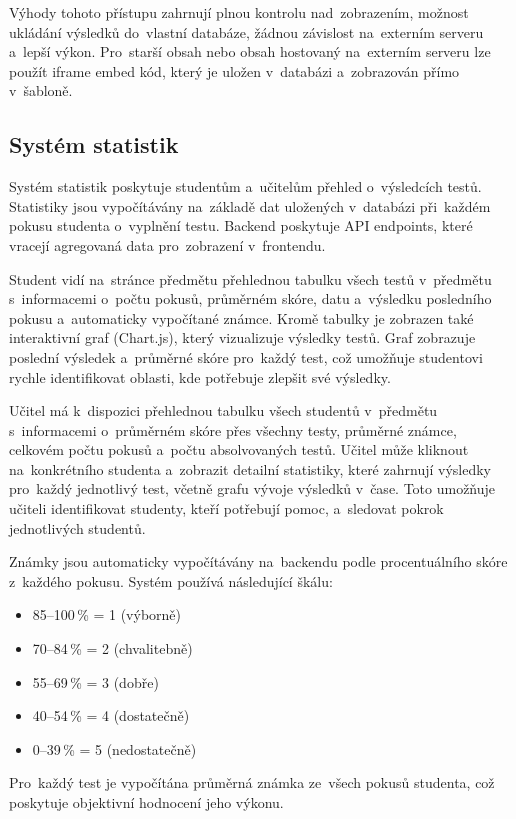\documentclass[12pt, a4paper,
twoside,
openany
]{report}
\begin{document}
	Výhody tohoto přístupu zahrnují plnou kontrolu nad~zobrazením, možnost ukládání výsledků do~vlastní databáze, žádnou závislost na~externím serveru a~lepší výkon. Pro~starší obsah nebo obsah hostovaný na~externím serveru lze použít iframe embed kód, který je uložen v~databázi a~zobrazován přímo v~šabloně.

	\subsection{Systém statistik}
	
	Systém statistik poskytuje studentům a~učitelům přehled o~výsledcích testů. Statistiky jsou vypočítávány na~základě dat uložených v~databázi při~každém pokusu studenta o~vyplnění testu. Backend poskytuje API endpoints, které vracejí agregovaná data pro~zobrazení v~frontendu.
	
	Student vidí na~stránce předmětu přehlednou tabulku všech testů v~předmětu s~informacemi o~počtu pokusů, průměrném skóre, datu a~výsledku posledního pokusu a~automaticky vypočítané známce. Kromě tabulky je zobrazen také interaktivní graf (Chart.js), který vizualizuje výsledky testů. Graf zobrazuje poslední výsledek a~průměrné skóre pro~každý test, což umožňuje studentovi rychle identifikovat oblasti, kde potřebuje zlepšit své výsledky.
	
	Učitel má k~dispozici přehlednou tabulku všech studentů v~předmětu s~informacemi o~průměrném skóre přes všechny testy, průměrné známce, celkovém počtu pokusů a~počtu absolvovaných testů. Učitel může kliknout na~konkrétního studenta a~zobrazit detailní statistiky, které zahrnují výsledky pro~každý jednotlivý test, včetně grafu vývoje výsledků v~čase. Toto umožňuje učiteli identifikovat studenty, kteří potřebují pomoc, a~sledovat pokrok jednotlivých studentů.
	
	Známky jsou automaticky vypočítávány na~backendu podle procentuálního skóre z~každého pokusu. Systém používá následující škálu:
	\begin{itemize}
		\item 85--100\,\% = 1 (výborně)
		\item 70--84\,\% = 2 (chvalitebně)
		\item 55--69\,\% = 3 (dobře)
		\item 40--54\,\% = 4 (dostatečně)
		\item 0--39\,\% = 5 (nedostatečně)
	\end{itemize}
	
	Pro~každý test je vypočítána průměrná známka ze~všech pokusů studenta, což poskytuje objektivní hodnocení jeho výkonu.
\end{document}
